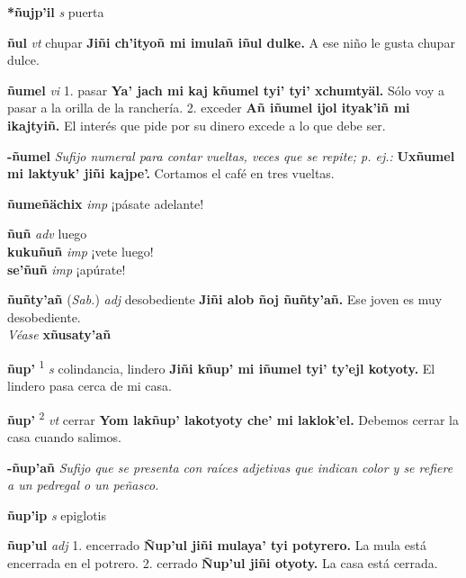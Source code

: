 \documentclass[10pt]{scrbook}
\newcommand{\entry}[1]{\textbf{#1}}
\newcommand{\onedefinition}[1]{#1.}
\newcommand{\defsuperscript}[1]{\textsuperscript{#1}}
\newcommand{\nontranslationdef}[1]{\textit{#1}}
\newcommand{\partofspeech}[1]{\textit{#1}}
\newcommand{\spanishtranslation}[1]{#1}
\newcommand{\cholexample}[1]{\textbf{#1}}
\newcommand{\exampletranslation}[1]{#1}
\newcommand{\alsosee}[1]{\\\textit{Véase} \textbf{#1}}
\newcommand{\relevantdialect}[1]{(\textit{#1})}
\newcommand{\secondaryentry}[1]{\\\textbf{#1}}
\newcommand{\secondpartofspeech}[1]{\textit{#1}}
\newcommand{\secondtranslation}[1]{#1}
\begin{document}
\begin{multicols}{2}
\entry{*ñujp'il}
\partofspeech{s}
\spanishtranslation{puerta}

\entry{ñul}
\partofspeech{vt}
\spanishtranslation{chupar}
\cholexample{Jiñi ch'ityoñ mi imulañ iñul dulke.}
\exampletranslation{A ese niño le gusta chupar dulce.}

\entry{ñumel}
\partofspeech{vi}
\onedefinition{1}
\spanishtranslation{pasar}
\cholexample{Ya' jach mi kaj kñumel tyi' tyi' xchumtyäl.}
\exampletranslation{Sólo voy a pasar a la orilla de la ranchería.}
\onedefinition{2}
\spanishtranslation{exceder}
\cholexample{Añ iñumel ijol ityak'iñ mi ikajtyiñ.}
\exampletranslation{El interés que pide por su dinero excede a lo que debe ser.}

\entry{-ñumel}
\nontranslationdef{Sufijo numeral para contar vueltas, veces que se repite; p. ej.:}
\cholexample{Uxñumel mi laktyuk' jiñi kajpe'.}
\exampletranslation{Cortamos el café en tres vueltas.}

\entry{ñumeñächix}
\partofspeech{imp}
\spanishtranslation{¡pásate adelante!}

\entry{ñuñ}
\partofspeech{adv}
\spanishtranslation{luego}
\secondaryentry{kukuñuñ}
\secondpartofspeech{imp}
\secondtranslation{¡vete luego!}
\secondaryentry{se'ñuñ}
\secondpartofspeech{imp}
\secondtranslation{¡apúrate!}

\entry{ñuñty'añ}
\relevantdialect{Sab.}
\partofspeech{adj}
\spanishtranslation{desobediente}
\cholexample{Jiñi alob ñoj ñuñty'añ.}
\exampletranslation{Ese joven es muy desobediente.}
\alsosee{xñusaty'añ}

\entry{ñup'}
\defsuperscript{1}
\partofspeech{s}
\spanishtranslation{colindancia, lindero}
\cholexample{Jiñi kñup' mi iñumel tyi' ty'ejl kotyoty.}
\exampletranslation{El lindero pasa cerca de mi casa.}

\entry{ñup'}
\defsuperscript{2}
\partofspeech{vt}
\spanishtranslation{cerrar}
\cholexample{Yom lakñup' lakotyoty che' mi laklok'el.}
\exampletranslation{Debemos cerrar la casa cuando salimos.}

\entry{-ñup'añ}
\nontranslationdef{Sufijo que se presenta con raíces adjetivas que indican color y se refiere a un pedregal o un peñasco.}

\entry{ñup'ip}
\partofspeech{s}
\spanishtranslation{epiglotis}

\entry{ñup'ul}
\partofspeech{adj}
\onedefinition{1}
\spanishtranslation{encerrado}
\cholexample{Ñup'ul jiñi mulaya' tyi potyrero.}
\exampletranslation{La mula está encerrada en el potrero.}
\onedefinition{2}
\spanishtranslation{cerrado}
\cholexample{Ñup'ul jiñi otyoty.}
\exampletranslation{La casa está cerrada.}


\end{multicols}
\end{document}
